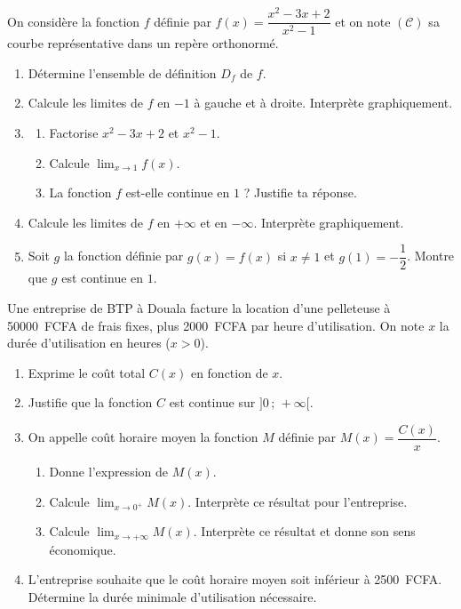 \documentclass[11pt]{article}
\begin{document}
\begin{exercice}
On considère la fonction $f$ définie par $f(x)=\dfrac{x^2-3x+2}{x^2-1}$ et on note $(\mathcal{C})$ sa courbe représentative dans un repère orthonormé.
\begin{enumerate}
\item Détermine l'ensemble de définition $D_f$ de $f$.
\item Calcule les limites de $f$ en $-1$ à gauche et à droite. Interprète graphiquement.
\item \begin{enumerate}
\item Factorise $x^2-3x+2$ et $x^2-1$.
\item Calcule $\displaystyle\lim_{x\to 1}f(x)$.
\item La fonction $f$ est-elle continue en $1$ ? Justifie ta réponse.
\end{enumerate}
\item Calcule les limites de $f$ en $+\infty$ et en $-\infty$. Interprète graphiquement.
\item Soit $g$ la fonction définie par $g(x)=f(x)$ si $x\neq 1$ et $g(1)=-\dfrac{1}{2}$. Montre que $g$ est continue en $1$.
\end{enumerate}
\end{exercice}

\begin{exercice}
Une entreprise de BTP à Douala facture la location d'une pelleteuse à \SI{50000}{FCFA} de frais fixes, plus \SI{2000}{FCFA} par heure d'utilisation. On note $x$ la durée d'utilisation en heures ($x>0$).
\begin{enumerate}
\item Exprime le coût total $C(x)$ en fonction de $x$.
\item Justifie que la fonction $C$ est continue sur $]0\,;\,+\infty[$.
\item On appelle coût horaire moyen la fonction $M$ définie par $M(x)=\dfrac{C(x)}{x}$.
\begin{enumerate}
\item Donne l'expression de $M(x)$.
\item Calcule $\displaystyle\lim_{x\to 0^+}M(x)$. Interprète ce résultat pour l'entreprise.
\item Calcule $\displaystyle\lim_{x\to+\infty}M(x)$. Interprète ce résultat et donne son sens économique.
\end{enumerate}
\item L'entreprise souhaite que le coût horaire moyen soit inférieur à \SI{2500}{FCFA}. Détermine la durée minimale d'utilisation nécessaire.
\end{enumerate}
\end{exercice}
\end{document}
